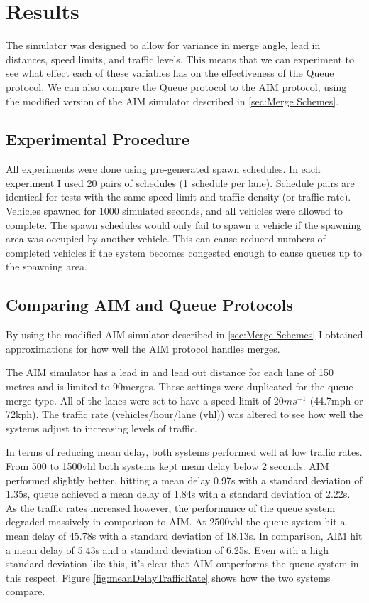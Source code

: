 \chapter{Results}
\label{cha:Results}
The simulator was designed to allow for variance in merge angle, lead in distances, speed limits, and traffic levels. This means that we can experiment to see what effect each of these variables has on the effectiveness of the Queue protocol. We can also compare the Queue protocol to the AIM protocol, using the modified version of the AIM simulator described in \ref{sec:Merge Schemes}.

\section{Experimental Procedure}
\label{sec:Experimental Procedure}
All experiments were done using pre-generated spawn schedules. In each experiment I used 20 pairs of schedules (1 schedule per lane). Schedule pairs are identical for tests with the same speed limit and traffic density (or traffic rate). Vehicles spawned for 1000 simulated seconds, and all vehicles were allowed to complete. The spawn schedules would only fail to spawn a vehicle if the spawning area was occupied by another vehicle. This can cause reduced numbers of completed vehicles if the system becomes congested enough to cause queues up to the spawning area. 

\section{Comparing AIM and Queue Protocols}
\label{sec:Comparing AIM and Queue Protocols}
By using the modified AIM simulator described in \ref{sec:Merge Schemes} I obtained approximations for how well the AIM protocol handles merges.

The AIM simulator has a lead in and lead out distance for each lane of 150 metres and is limited to 90\degree merges. These settings were duplicated for the queue merge type. All of the lanes were set to have a speed limit of 20$\si{ms^{-1}}$ (44.7\si{mph} or 72\si{kph}). The traffic rate (vehicles/hour/lane (\si{vhl})) was altered to see how well the systems adjust to increasing levels of traffic.

In terms of reducing mean delay, both systems performed well at low traffic rates. From 500 to 1500\si{vhl} both systems kept mean delay below 2 seconds. AIM performed slightly better, hitting a mean delay 0.97\si{s} with a standard deviation of 1.35\si{s}, queue achieved a mean delay of 1.84\si{s} with a standard deviation of 2.22\si{s}. As the traffic rates increased however, the performance of the queue system degraded massively in comparison to AIM. At 2500\si{vhl} the queue system hit a mean delay of 45.78\si{s} with a standard deviation of 18.13\si{s}. In comparison, AIM hit a mean delay of 5.43\si{s} and a standard deviation of 6.25\si{s}. Even with a high standard deviation like this, it's clear that AIM outperforms the queue system in this respect. Figure \ref{fig:meanDelayTrafficRate} shows how the two systems compare.

